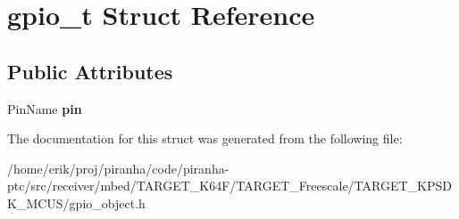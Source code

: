 \hypertarget{structgpio__t}{}\section{gpio\+\_\+t Struct Reference}
\label{structgpio__t}
\subsection*{Public Attributes}
\begin{DoxyCompactItemize}
\item 
Pin\+Name {\bfseries pin}\hypertarget{structgpio__t_ae31fd8dc09fc2058c8238b96a32523c6}{}\label{structgpio__t_ae31fd8dc09fc2058c8238b96a32523c6}

\end{DoxyCompactItemize}


The documentation for this struct was generated from the following file\+:\begin{DoxyCompactItemize}
\item 
/home/erik/proj/piranha/code/piranha-\/ptc/src/receiver/mbed/\+T\+A\+R\+G\+E\+T\+\_\+\+K64\+F/\+T\+A\+R\+G\+E\+T\+\_\+\+Freescale/\+T\+A\+R\+G\+E\+T\+\_\+\+K\+P\+S\+D\+K\+\_\+\+M\+C\+U\+S/gpio\+\_\+object.\+h\end{DoxyCompactItemize}
